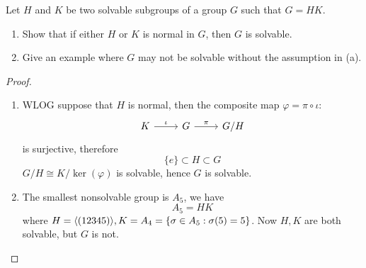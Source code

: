 \begin{prob}[S2009-Q1]
    Let \( H \) and \( K \) be two solvable subgroups of a group \( G \) such that \( G = HK \).
    
    \begin{enumerate}
        \item Show that if either \( H \) or \( K \) is normal in \( G \), then \( G \) is solvable.
        
        \item Give an example where \( G \) may not be solvable without the assumption in (a).
    \end{enumerate}
\end{prob}
\begin{proof}
    \begin{enumerate}
        \item WLOG suppose that $H$ is normal, then the composite map $\varphi=\pi\circ\iota$: 
        \[\begin{tikzcd}
            K & G & {G/H}
            \arrow["\iota", from=1-1, to=1-2]
            \arrow["\pi", from=1-2, to=1-3]
        \end{tikzcd}\]
        is surjective, therefore 
        \begin{equation*}
            \{e\}\subset H\subset G
        \end{equation*}
        $G/H\cong K/\ker(\varphi)$ is solvable, hence $G$ is solvable.
        \item The smallest nonsolvable group is $A_5$, we have 
        \begin{equation*}
            A_5=HK
        \end{equation*}
        where $H=\langle(12345)\rangle, K=A_4=\{\sigma\in A_5: \sigma(5)=5\}$. Now $H, K$ are both solvable, but $G$ is not.
    \end{enumerate}
\end{proof}

